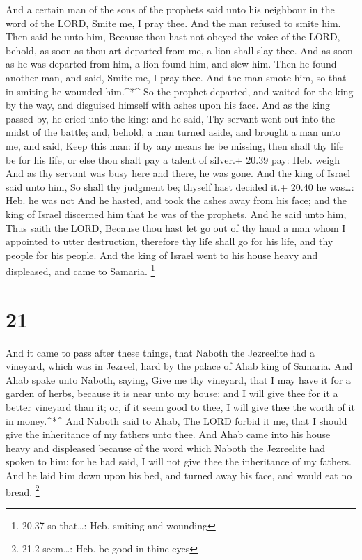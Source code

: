  And a certain man of the sons of the prophets said unto
his neighbour in the word of the LORD, Smite me, I pray thee. And the
man refused to smite him.  Then said he unto him, Because
thou hast not obeyed the voice of the LORD, behold, as soon as thou art
departed from me, a lion shall slay thee. And as soon as he was departed
from him, a lion found him, and slew him.  Then he found
another man, and said, Smite me, I pray thee. And the man smote him, so
that in smiting he wounded him.\^{}*\^{}  So the prophet
departed, and waited for the king by the way, and disguised himself with
ashes upon his face.  And as the king passed by, he cried
unto the king: and he said, Thy servant went out into the midst of the
battle; and, behold, a man turned aside, and brought a man unto me, and
said, Keep this man: if by any means he be missing, then shall thy life
be for his life, or else thou shalt pay a talent of silver.+ 20.39 pay:
Heb. weigh  And as thy servant was busy here and there, he
was gone. And the king of Israel said unto him, So shall thy judgment
be; thyself hast decided it.+ 20.40 he was\ldots: Heb. he was not
 And he hasted, and took the ashes away from his face; and
the king of Israel discerned him that he was of the prophets.
 And he said unto him, Thus saith the LORD, Because thou
hast let go out of thy hand a man whom I appointed to utter destruction,
therefore thy life shall go for his life, and thy people for his people.
 And the king of Israel went to his house heavy and
displeased, and came to Samaria. \footnote{20.37 so that\ldots: Heb.
  smiting and wounding}

\hypertarget{section-20}{%
\section{21}\label{section-20}}

 And it came to pass after these things, that Naboth the
Jezreelite had a vineyard, which was in Jezreel, hard by the palace of
Ahab king of Samaria.  And Ahab spake unto Naboth, saying,
Give me thy vineyard, that I may have it for a garden of herbs, because
it is near unto my house: and I will give thee for it a better vineyard
than it; or, if it seem good to thee, I will give thee the worth of it
in money.\^{}*\^{}  And Naboth said to Ahab, The LORD forbid
it me, that I should give the inheritance of my fathers unto thee.
 And Ahab came into his house heavy and displeased because
of the word which Naboth the Jezreelite had spoken to him: for he had
said, I will not give thee the inheritance of my fathers. And he laid
him down upon his bed, and turned away his face, and would eat no bread.
\footnote{21.2 seem\ldots: Heb. be good in thine eyes}

